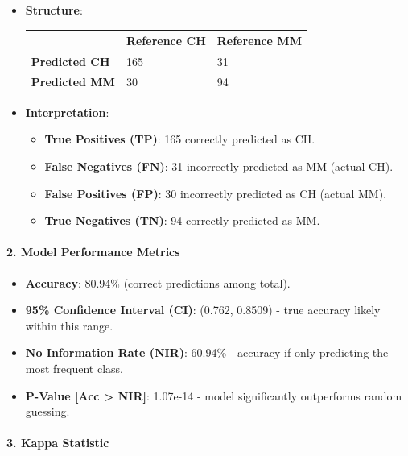 \documentclass[
]{article}
\providecommand{\tightlist}{%
  \setlength{\itemsep}{0pt}\setlength{\parskip}{0pt}}
\begin{document}
\begin{itemize}
\item
  \textbf{Structure}:

  \begin{longtable}[]{@{}lll@{}}
  \toprule\noalign{}
  & Reference CH & Reference MM \\
  \midrule\noalign{}
  \endhead
  \bottomrule\noalign{}
  \endlastfoot
  \textbf{Predicted CH} & 165 & 31 \\
  \textbf{Predicted MM} & 30 & 94 \\
  \end{longtable}
\item
  \textbf{Interpretation}:

  \begin{itemize}
  \tightlist
  \item
    \textbf{True Positives (TP)}: 165 correctly predicted as CH.
  \item
    \textbf{False Negatives (FN)}: 31 incorrectly predicted as MM
    (actual CH).
  \item
    \textbf{False Positives (FP)}: 30 incorrectly predicted as CH
    (actual MM).
  \item
    \textbf{True Negatives (TN)}: 94 correctly predicted as MM.
  \end{itemize}
\end{itemize}

\hypertarget{model-performance-metrics-1}{%
\paragraph{\texorpdfstring{2. \textbf{Model Performance
Metrics}}{2. Model Performance Metrics}}\label{model-performance-metrics-1}}

\begin{itemize}
\tightlist
\item
  \textbf{Accuracy}: 80.94\% (correct predictions among total).
\item
  \textbf{95\% Confidence Interval (CI)}: (0.762, 0.8509) - true
  accuracy likely within this range.
\item
  \textbf{No Information Rate (NIR)}: 60.94\% - accuracy if only
  predicting the most frequent class.
\item
  \textbf{P-Value {[}Acc \textgreater{} NIR{]}}: 1.07e-14 - model
  significantly outperforms random guessing.
\end{itemize}

\hypertarget{kappa-statistic-1}{%
\paragraph{\texorpdfstring{3. \textbf{Kappa
Statistic}}{3. Kappa Statistic}}\label{kappa-statistic-1}}
\end{document}
